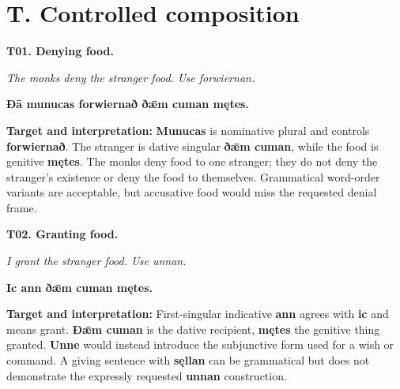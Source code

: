 \section*{T. Controlled composition}

\par\begin{minipage}{\linewidth}\raggedright
\textbf{T01. Denying food.}

\emph{The monks deny the stranger food. Use forwiernan.}

\textbf{Ðā munucas forwiernað ðǣm cuman mętes.}

\textbf{Target and interpretation:} \textbf{Munucas} is nominative plural and controls \textbf{forwiernað}. The stranger is dative singular \textbf{ðǣm cuman}, while the food is genitive \textbf{mętes}. The monks deny food to one stranger; they do not deny the stranger's existence or deny the food to themselves. Grammatical word-order variants are acceptable, but accusative food would miss the requested denial frame.

\end{minipage}\par\addvspace{4pt}

\par\begin{minipage}{\linewidth}\raggedright
\textbf{T02. Granting food.}

\emph{I grant the stranger food. Use unnan.}

\textbf{Ic ann ðǣm cuman mętes.}

\textbf{Target and interpretation:} First-singular indicative \textbf{ann} agrees with \textbf{ic} and means grant. \textbf{Ðǣm cuman} is the dative recipient, \textbf{mętes} the genitive thing granted. \textbf{Unne} would instead introduce the subjunctive form used for a wish or command. A giving sentence with \textbf{sęllan} can be grammatical but does not demonstrate the expressly requested \textbf{unnan} construction.

\end{minipage}\par\addvspace{4pt}

